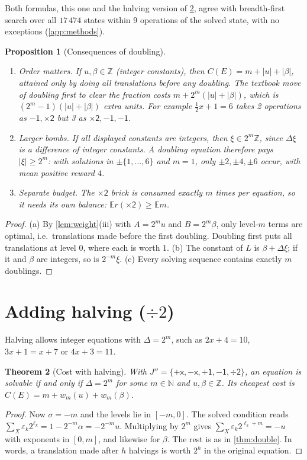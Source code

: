 \documentclass[11pt,a4paper]{article}
\newtheorem{theorem}{Theorem}[section]
\newtheorem{proposition}[theorem]{Proposition}
\theoremstyle{definition}
\theoremstyle{remark}
\newcommand{\N}{\mathbb{N}}
\newcommand{\Z}{\mathbb{Z}}
\newcommand{\E}{\mathbb{E}}
\newcommand{\pX}{\ensuremath{\mathord{+}\mathsf{x}}}
\newcommand{\mX}{\ensuremath{\mathord{-}\mathsf{x}}}
\newcommand{\pU}{\ensuremath{\mathord{+}\mathsf{1}}}
\newcommand{\mU}{\ensuremath{\mathord{-}\mathsf{1}}}
\newcommand{\dbl}{\ensuremath{\mathord{\times}\mathsf{2}}}
\newcommand{\hlv}{\ensuremath{\mathord{\div}\mathsf{2}}}
\newcommand{\abs}[1]{\lvert #1\rvert}
\begin{document}
Both formulas, this one and the halving version of \cref{thm:halve}, agree with
breadth-first search over all $17\,474$ states within 9 operations of the solved state,
with no exceptions (\cref{app:methods}).

\begin{proposition}[Consequences of doubling]\label{prop:double-econ}
\leavevmode
\begin{enumerate}[label=(\alph*),nosep]
\item \emph{Order matters.} If $u,\beta\in\Z$ (integer constants), then
  $C(E)=m+\abs u+\abs\beta$, attained only by doing all translations \emph{before} any
  doubling. The textbook move of doubling first to clear the fraction costs
  $m+2^m(\abs u+\abs\beta)$, which is $(2^m-1)(\abs u+\abs\beta)$ extra units. For
  example $\frac12x+1=6$ takes 2 operations as $\mU,\dbl$ but 3 as $\dbl,\mU,\mU$.
\item \emph{Larger bombs.} If all displayed constants are integers, then
  $\xi\in2^m\Z$, since $\Delta\xi$ is a difference of integer constants. A doubling
  equation therefore pays $\abs\xi\ge2^m$: with solutions in $\pm\{1,\dots,6\}$ and
  $m=1$, only $\pm2,\pm4,\pm6$ occur, with mean positive reward $4$.
\item \emph{Separate budget.} The $\dbl$ brick is consumed exactly $m$ times per
  equation, so it needs its own balance: $\E r(\dbl)\ge\E m$.
\end{enumerate}
\end{proposition}
\begin{proof}
(a) By \cref{lem:weight}(iii) with $A=2^mu$ and $B=2^m\beta$, only level-$m$ terms are
optimal, i.e.\ translations made before the first doubling. Doubling first puts all
translations at level $0$, where each is worth $1$.
(b) The constant of $L$ is $\beta+\Delta\xi$; if it and $\beta$ are integers, so is
$2^{-m}\xi$.
(c) Every solving sequence contains exactly $m$ doublings.
\end{proof}

\section{Adding halving (\texorpdfstring{$\div2$}{:2})}\label{sec:halve}

Halving allows integer equations with $\Delta=2^m$, such as $2x+4=10$,
$3x+1=x+7$ or $4x+3=11$.

\begin{theorem}[Cost with halving]\label{thm:halve}
With $J''=\{\pX,\mX,\pU,\mU,\hlv\}$, an equation is solvable if and only if $\Delta=2^m$
for some $m\in\N$ and $u,\beta\in\Z$. Its cheapest cost is $C(E)=m+w_m(u)+w_m(\beta)$.
\end{theorem}
\begin{proof}
Now $\sigma=-m$ and the levels lie in $[-m,0]$. The solved condition reads
$\sum_X\varepsilon_k2^{\ell_k}=1-2^{-m}\alpha=-2^{-m}u$. Multiplying by $2^m$ gives
$\sum_X\varepsilon_k2^{\ell_k+m}=-u$ with exponents in $[0,m]$, and likewise for $\beta$.
The rest is as in \cref{thm:double}. In words, a translation made after $h$ halvings is
worth $2^h$ in the original equation.
\end{proof}
\end{document}
